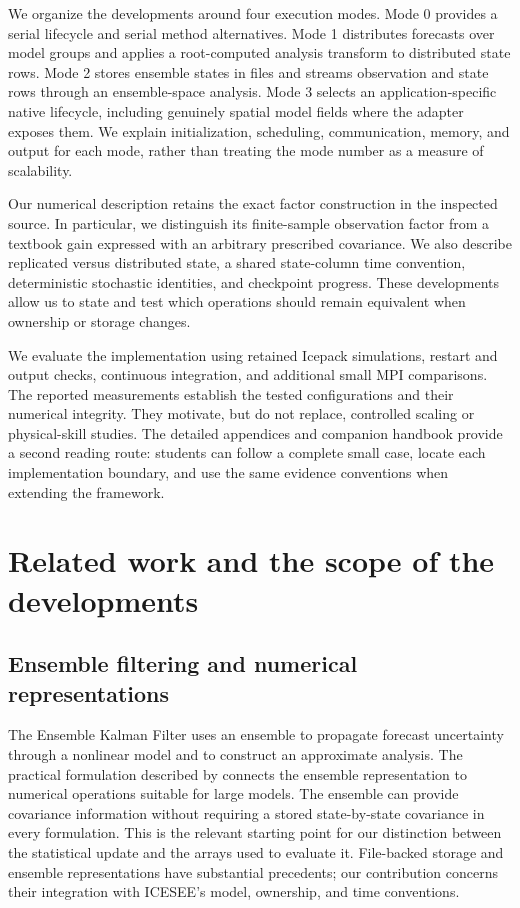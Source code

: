 \documentclass[11pt,a4paper]{article}
\begin{document}
We organize the developments around four execution modes. Mode 0 provides a serial lifecycle and serial method alternatives. Mode 1 distributes forecasts over model groups and applies a root-computed analysis transform to distributed state rows. Mode 2 stores ensemble states in files and streams observation and state rows through an ensemble-space analysis. Mode 3 selects an application-specific native lifecycle, including genuinely spatial model fields where the adapter exposes them. We explain initialization, scheduling, communication, memory, and output for each mode, rather than treating the mode number as a measure of scalability.

Our numerical description retains the exact factor construction in the inspected source. In particular, we distinguish its finite-sample observation factor from a textbook gain expressed with an arbitrary prescribed covariance. We also describe replicated versus distributed state, a shared state-column time convention, deterministic stochastic identities, and checkpoint progress. These developments allow us to state and test which operations should remain equivalent when ownership or storage changes.

We evaluate the implementation using retained Icepack simulations, restart and output checks, continuous integration, and additional small MPI comparisons. The reported measurements establish the tested configurations and their numerical integrity. They motivate, but do not replace, controlled scaling or physical-skill studies. The detailed appendices and companion handbook provide a second reading route: students can follow a complete small case, locate each implementation boundary, and use the same evidence conventions when extending the framework.

\section{Related work and the scope of the developments}
\subsection{Ensemble filtering and numerical representations}
The Ensemble Kalman Filter uses an ensemble to propagate forecast uncertainty through a nonlinear model and to construct an approximate analysis. The practical formulation described by \citet{evensen2003} connects the ensemble representation to numerical operations suitable for large models. The ensemble can provide covariance information without requiring a stored state-by-state covariance in every formulation. This is the relevant starting point for our distinction between the statistical update and the arrays used to evaluate it. File-backed storage and ensemble representations have substantial precedents; our contribution concerns their integration with ICESEE's model, ownership, and time conventions.
\end{document}
